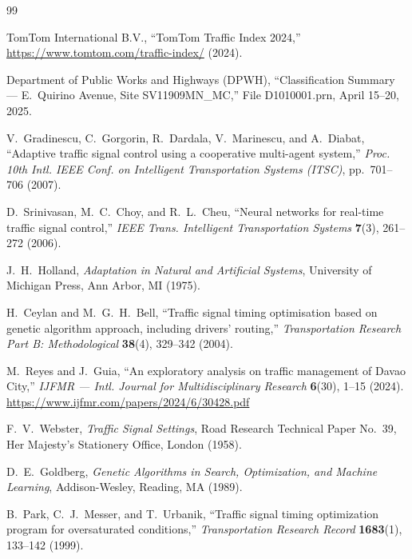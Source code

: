 \documentclass[a4paper,10pt]{article}
\begin{document}
	\begin{thebibliography}{99}
		
		TomTom International B.V., ``TomTom Traffic Index 2024,''
		\url{https://www.tomtom.com/traffic-index/} (2024).
		
		Department of Public Works and Highways (DPWH),
		``Classification Summary --- E.~Quirino Avenue, Site SV11909MN\_MC,''
		File D1010001.prn, April 15--20, 2025.
		
		V.~Gradinescu, C.~Gorgorin, R.~Dardala, V.~Marinescu, and A.~Diabat,
		``Adaptive traffic signal control using a cooperative multi-agent system,''
		\textit{Proc. 10th Intl. IEEE Conf. on Intelligent Transportation Systems (ITSC)},
		pp.~701--706 (2007).
		
		D.~Srinivasan, M.~C.~Choy, and R.~L.~Cheu,
		``Neural networks for real-time traffic signal control,''
		\textit{IEEE Trans. Intelligent Transportation Systems}
		\textbf{7}(3), 261--272 (2006).
		
		J.~H.~Holland,
		\textit{Adaptation in Natural and Artificial Systems},
		University of Michigan Press, Ann Arbor, MI (1975).
		
		H.~Ceylan and M.~G.~H.~Bell,
		``Traffic signal timing optimisation based on genetic algorithm approach,
		including drivers' routing,''
		\textit{Transportation Research Part B: Methodological}
		\textbf{38}(4), 329--342 (2004).
		
		M.~Reyes and J.~Guia,
		``An exploratory analysis on traffic management of Davao City,''
		\textit{IJFMR --- Intl. Journal for Multidisciplinary Research}
		\textbf{6}(30), 1--15 (2024).
		\newblock \url{https://www.ijfmr.com/papers/2024/6/30428.pdf}
		
		F.~V.~Webster,
		\textit{Traffic Signal Settings},
		Road Research Technical Paper No.~39,
		Her Majesty's Stationery Office, London (1958).
		
		D.~E.~Goldberg,
		\textit{Genetic Algorithms in Search, Optimization, and Machine Learning},
		Addison-Wesley, Reading, MA (1989).
		
		B.~Park, C.~J.~Messer, and T.~Urbanik,
		``Traffic signal timing optimization program for oversaturated conditions,''
		\textit{Transportation Research Record}
		\textbf{1683}(1), 133--142 (1999).
		

\end{thebibliography}
\end{document}
